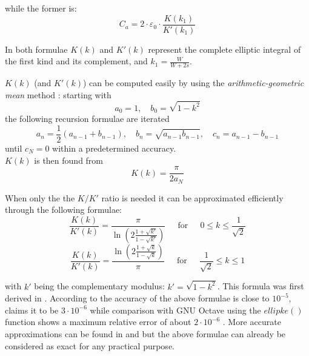 while the former is:
\begin{equation}
C_a = 2\cdot \varepsilon_0\cdot \dfrac{K(k_1)}{K'(k_1)}
\end{equation}

In both formulae $K(k)$ and $K'(k)$ represent the complete elliptic
integral of the first kind and its complement, and $k_1=
\tfrac{W}{W+2s}$.

\addvspace{12pt}

$K(k)$ (and $K'(k)$) can be computed easily by using the \emph{arithmetic-geometric mean} method \cite{Abramowitz}: starting with
\begin{equation}
a_0 = 1, \quad b_0 = \sqrt{1 -k^2}
\end{equation}
the following recursion formulae are iterated
\begin{equation}
a_n = \dfrac{1}{2}(a_{n-1}+b_{n-1}), \quad b_n = \sqrt{a_{n-1}b_{n-1}}, \quad c_n=a_{n-1}-b_{n-1}
\end{equation}
until $c_N=0$ within a predetermined accuracy.\\
$K(k)$ is then found from
\begin{equation}
K(k) = \dfrac{\pi}{2 a_N}
\end{equation}

\addvspace{12pt}

When only the the $K/K'$ ratio is needed it can be approximated
efficiently through the following formulae:
\begin{equation}
\dfrac{K(k)}{K'(k)} =
\dfrac{\pi}{\ln\left(2\tfrac{1+\sqrt{k'}}{1-\sqrt{k'}}\right)}
\;\;\;\; \textrm{ for } \;\;\;\;
0 \le k \le \dfrac{1}{\sqrt{2}}
\end{equation}
\begin{equation}
\dfrac{K(k)}{K'(k)} =
\dfrac{\ln\left(2\tfrac{1+\sqrt{k}}{1-\sqrt{k}}\right)}{\pi}
\;\;\;\; \textrm{ for } \;\;\;\;
\dfrac{1}{\sqrt{2}} \le k \le 1
\end{equation}

with $k'$ being the complementary modulus: $k'=\sqrt{1-k^2}$.
This formula was first derived in \cite{Hilberg}. According to
\cite{Collin} the accuracy of the above formulae is close
to $10^{-5}$, \cite{Gupta1} claims it to be $3\cdot10^{-6}$ while comparison
with GNU Octave using the $ellipke()$ function shows a maximum relative error
of about $2\cdot10^{-6}$ . More accurate approximations can be found in 
\cite{Hilberg} and \cite{Abbott} but the above formulae can already be 
considered as exact for any practical purpose.

\addvspace{12pt}

